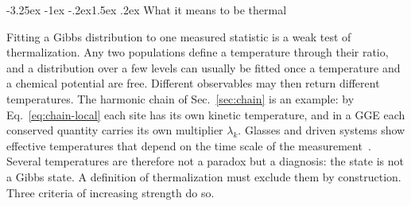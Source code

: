 \documentclass[10pt,a4paper]{article}
\makeatletter
\renewcommand{\subsection}{\@startsection{subsection}{2}{\z@}%
  {-3.25ex \@plus -1ex \@minus -.2ex}{1.5ex \@plus .2ex}%
  {\normalfont\fontsize{15.5pt}{19pt}\selectfont\bfseries}}
\makeatother
\begin{document}
\subsection{What it means to be thermal}
\label{sec:thermal-criteria}

Fitting a Gibbs distribution to one measured statistic is a weak test of thermalization.
Any two populations define a temperature through their ratio, and a distribution over a few levels can usually be fitted once a temperature and a chemical potential are free.
Different observables may then return different temperatures.
The harmonic chain of Sec.~\ref{sec:chain} is an example: by Eq.~\eqref{eq:chain-local} each site has its own kinetic temperature, and in a GGE each conserved quantity carries its own multiplier $ \lambda_k $.
Glasses and driven systems show effective temperatures that depend on the time scale of the measurement~\cite{Cugliandolo2011}.
Several temperatures are therefore not a paradox but a diagnosis: the state is not a Gibbs state.
A definition of thermalization must exclude them by construction.
Three criteria of increasing strength do so.
\end{document}
